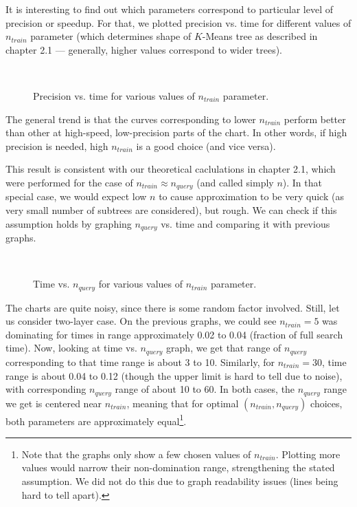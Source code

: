 It is interesting to find out which parameters correspond to particular level
of precision or speedup. For that, we plotted precision vs. time for different
values of $n_{train}$ parameter (which determines shape of $K$-Means tree as
described in chapter 2.1 --- generally, higher values correspond to wider
trees).


\begin{figure}
	\centering
	\\
	\caption{Precision vs. time for various values of $n_{train}$ parameter.}
\end{figure}

The general trend is that the curves corresponding to lower $n_{train}$ perform
better than other at high-speed, low-precision parts of the chart. In other
words, if high precision is needed, high $n_{train}$ is a good choice (and vice
versa).

This result is consistent with our theoretical caclulations in chapter 2.1, which
were performed for the case of $n_{train} \approx n_{query}$ (and called simply $n$).
In that special case, we would expect low $n$ to cause approximation to be very
quick (as very small number of subtrees are considered), but rough. We can
check if this assumption holds by graphing $n_{query}$ vs. time and comparing
it with previous graphs.

\begin{figure}
	\centering
	\\
	\caption{Time vs. $n_{query}$ for various values of $n_{train}$ parameter.}
\end{figure}

The charts are quite noisy, since there is some random factor involved. Still,
let us consider two-layer case. On the previous graphs, we could see 
$n_{train} = 5$ was dominating for times in range approximately 0.02 to 
0.04 (fraction of full search time). Now, looking at time vs. $n_{query}$ graph,
we get that range of $n_{query}$ corresponding to that time range is about
3 to 10. Similarly, for $n_{train} = 30$, time range is about 0.04 to 0.12
(though the upper limit is hard to tell due to noise), with corresponding
$n_{query}$ range of about 10 to 60. In both cases, the $n_{query}$ range we
get is centered near $n_{train}$, meaning that for optimal 
$(n_{train}, n_{query})$ choices, both parameters are approximately 
equal\footnote{
Note that the graphs only show a few chosen values of $n_{train}$. Plotting
more values would narrow their non-domination range, strengthening the 
stated assumption. We did not do this due to graph readability issues
(lines being hard to tell apart).
}.
